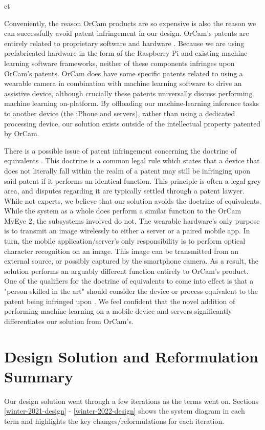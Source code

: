 ct\documentclass[a4paper,11pt]{article}
\begin{document}
Conveniently, the reason OrCam products are so expensive is also the reason we can successfully avoid patent infringement in our design. OrCam's patents are entirely related to proprietary software \cite{orcam-software} and hardware \cite{orcam-hardware}. Because we are using prefabricated hardware in the form of the Raspberry Pi and existing machine-learning software frameworks, neither of these components infringes upon OrCam's patents. OrCam does have some specific patents related to using a wearable camera in combination with machine learning software to drive an assistive device, although crucially these patents universally discuss performing machine learning on-platform. By offloading our machine-learning inference tasks to another device (the iPhone and servers), rather than using a dedicated processing device, our solution exists outside of the intellectual property patented by OrCam.

There is a possible issue of patent infringement concerning the doctrine of equivalents \cite{doctrine-of-equivalents}. This doctrine is a common legal rule which states that a device that does not literally fall within the realm of a patent may still be infringing upon said patent if it performs an identical function. This principle is often a legal grey area, and disputes regarding it are typically settled through a patent lawyer. While not experts, we believe that our solution avoids the doctrine of equivalents. While the system as a whole does perform a similar function to the OrCam MyEye 2, the subsystems involved do not. The wearable hardware's only purpose is to transmit an image wirelessly to either a server or a paired mobile app. In turn, the mobile application/server's only responsibility is to perform optical character recognition on an image. This image can be transmitted from an external source, or possibly captured by the smartphone camera. As a result, the solution performs an arguably different function entirely to OrCam's product. One of the qualifiers for the doctrine of equivalents to come into effect is that a "person skilled in the art" should consider the device or process equivalent to the patent being infringed upon \cite{doctrine-of-equivalents}. We feel confident that the novel addition of performing machine-learning on a mobile device and servers significantly differentiates our solution from OrCam's.


\section{Design Solution and Reformulation Summary}
Our design solution went through a few iterations as the terms went on. Sections \ref{winter-2021-design} - \ref{winter-2022-design} shows the system diagram in each term and highlights the key changes/reformulations for each iteration.
\end{document}
